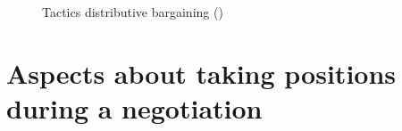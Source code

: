 \documentclass[
  ignorenonframetext,
]{beamer}
\begin{document}
\begin{frame}{}
\label{section-11}
\begin{figure}


\caption{\label{fig-tactics-distributive-bargaining-2}Tactics
distributive bargaining
()}

\end{figure}%
\end{frame}

\section{Aspects about taking positions during a
negotiation}\label{aspects-about-taking-positions-during-a-negotiation}
\end{document}
